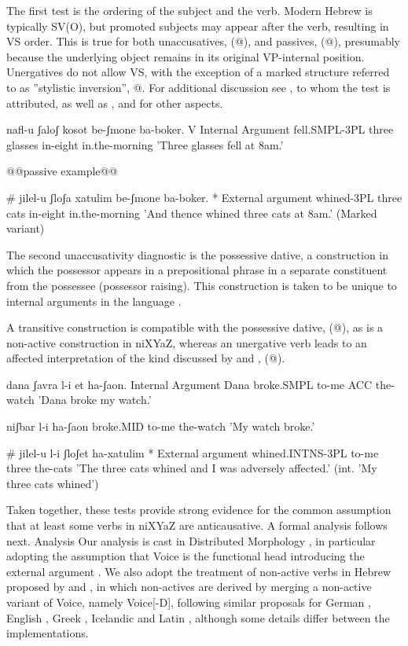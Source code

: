 The first test is the ordering of the subject and the verb. Modern Hebrew is typically SV(O), but promoted subjects may appear after the verb, resulting in VS order. This is true for both unaccusatives, (@), and passives, (@), presumably because the underlying object remains in its original VP-internal position. Unergatives do not allow VS, with the exception of a marked structure referred to as ''stylistic inversion'', @. For additional discussion see \cite{shlonsky87}, to whom the test is attributed, as well as \cite{shlonskydoron91}, \cite{borer95} and \cite{preminger10} for other aspects.

nafl-u ʃaloʃ kosot be-ʃmone ba-boker.         V Internal Argument
     fell.SMPL-3PL three glasses in-eight in.the-morning
     'Three glasses fell at 8am.'
    
    @@passive example@@

     \# jilel-u ʃloʃa xatulim be-ʃmone ba-boker.    * External argument
         whined-3PL three cats in-eight in.the-morning
        'And thence whined three cats at 8am.' (Marked variant)
   
The second unaccusativity diagnostic is the possessive dative, a construction in which the possessor appears in a prepositional phrase in a separate constituent from the possessee (possessor raising). This construction is taken to be unique to internal arguments in the language \citep{borergrodzinsky86}.

A transitive construction is compatible with the possessive dative, (@), as is a non-active construction in niXYaZ, whereas an unergative verb leads to an affected interpretation of the kind discussed by \cite{arieletal15} and \cite{barashersiegalboneh16}, (@). 

dana ʃavra l-i et ha-ʃaon.        Internal Argument
 Dana broke.SMPL to-me ACC the-watch
 'Dana broke my watch.'

      niʃbar l-i ha-ʃaon
         broke.MID to-me the-watch
         'My watch broke.'
                 
        \# jilel-u l-i ʃloʃet ha-xatulim        * External argument
         whined.INTNS-3PL to-me three the-cats
         'The three cats whined and I was adversely affected.' (int. 'My three cats whined')
   
Taken together, these tests provide strong evidence for the common assumption that at least some verbs in niXYaZ are anticausative. A formal analysis follows next.
Analysis
Our analysis is cast in Distributed Morphology \citep{dm}, in particular adopting the assumption that Voice is the functional head introducing the external argument \citep{kratzer96,pylkkanen08}. We also adopt the treatment of non-active verbs in Hebrew proposed by \cite{alexiadoudoron12} and \cite{kastner17gjgl}, in which non-actives are derived by merging a non-active variant of Voice, namely Voice[-D], following similar proposals for German \citep{schaefer08,layering15}, English \cite{bruening14nllt}, Greek \citep{alexiadoudoron12,spathasetal15}, Icelandic \citep{wood15springer} and Latin \citep{kastnerzu15li}, although some details differ between the implementations.

